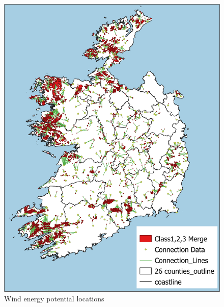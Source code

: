 \documentclass[journal abbreviation, manuscript]{copernicus}
\begin{document}
\begin{figure}[!htbp]
 \centering
 \includegraphics[scale=0.6]{WindPotentialMap.png} 
 \caption{Wind energy potential locations}
 \label{fig:wind-onshore-potential}
\end{figure}

\end{document}
